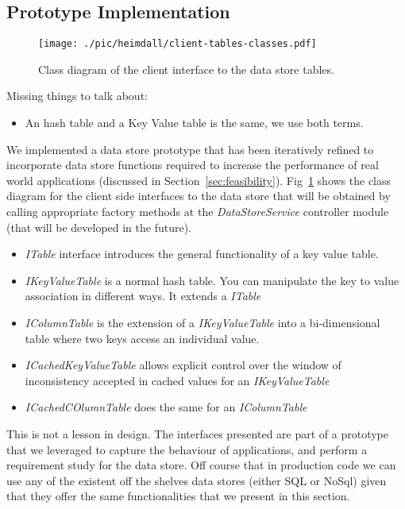 \documentclass[12pt,openright,twoside]{report}
\begin{document}
\subsection{Prototype Implementation}
\begin{figure}[ht]
  \centering
  \texttt{[image: ./pic/heimdall/client-tables-classes.pdf]}
  \caption{Class diagram of the client interface to the data store tables.}
\label{fig:design:class-diagram}
\end{figure}

Missing things to talk about: 
\begin{itemize}
\item An hash table and a Key Value table is the same, we use both terms. 
\end{itemize}

We implemented a  data store prototype that has been iteratively refined to incorporate data store functions required to increase the performance of real world applications (discussed in Section~\ref{sec:feasibility}).  
Fig~\ref{fig:design:class-diagram} shows the class diagram for the client side interfaces to the data store that will be obtained by calling appropriate factory methods at the \emph{DataStoreService} controller module (that will  be developed in the future).  
\begin{itemize}
\item \emph{ITable} interface introduces the general functionality of a key value table.
\item \emph{IKeyValueTable}  is a normal hash table. You can manipulate the key to value association in different ways. It extends a \emph{ITable}
\item \emph{IColumnTable} is the extension of a \emph{IKeyValueTable} into a bi-dimensional table where two keys access an individual value. 
\item \emph{ICachedKeyValueTable} allows explicit control over the window of inconsistency accepted in cached values for an \emph{IKeyValueTable} 
\item \emph{ICachedCOlumnTable} does the same for an \emph{IColumnTable} 
\end{itemize}

This is not a lesson in design. The interfaces presented are part of a prototype that we leveraged to capture the behaviour of applications, and perform a requirement study for the data store. Off course that in production code we can use any of the existent off the shelves data stores (either SQL or NoSql) given that they offer the same functionalities that we present in this section. 
\end{document}
